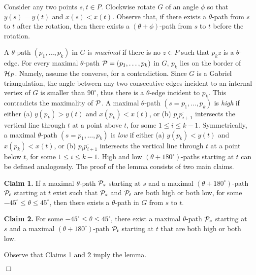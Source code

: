 \documentclass{llncs}
\renewenvironment{proof}
{{\bf Proof:}}{\hspace*{\fill}$\Box$\par\vspace{2mm}}
\begin{document}
\begin{proof}
Consider any two points $s,t\in P$. Clockwise rotate $G$ of an angle $\phi$ so that $y(s)=y(t)$ and $x(s)<x(t)$. Observe that, if there exists a $\theta$-path from $s$ to $t$ after the rotation, then there exists a $(\theta+\phi)$-path from $s$ to $t$ before the rotation.

A $\theta$-path $(p_1,\dots,p_k)$ in $G$ is {\em maximal} if there is no $z\in P$ such that $\overline{p_kz}$ is a $\theta$-edge. For every maximal $\theta$-path ${\cal P}=(p_1, \ldots , p_k)$ in $G$, $p_k$ lies on the border of ${\cal H}_P$. Namely, assume the converse, for a contradiction. Since $G$ is a Gabriel triangulation, the angle between any two consecutive edges incident to an internal vertex of $G$ is smaller than $90^\circ$, thus there is a $\theta$-edge incident to $p_k$.  This contradicts the maximality of $\cal P$.  A maximal $\theta$-path $(s=p_1, \ldots , p_k)$ is {\em high} if either (a) $y(p_k)>y(t)$ and $x(p_k)<x(t)$, or (b) $\overline{p_i p_{i+1}}$ intersects the vertical line through $t$ at a point above $t$, for some $1\leq i\leq k-1$. Symmetrically, a maximal $\theta$-path $(s=p_1, \ldots , p_k)$ is {\em low} if either (a) $y(p_k)<y(t)$ and $x(p_k)<x(t)$, or (b) $\overline{p_i p_{i+1}}$ intersects the vertical line through $t$ at a point below $t$, for some $1\leq i\leq k-1$. High and low $(\theta+180^\circ)$-paths starting at $t$ can be defined analogously. The proof of the lemma consists of two main claims.

{\bf Claim 1.} If a maximal $\theta$-path ${\cal P}_s$ starting at $s$ and a maximal $(\theta+180^\circ)$-path ${\cal P}_t$ starting at $t$ exist such that ${\cal P}_s$ and ${\cal P}_t$ are both high or both low, for some $-45^\circ\leq \theta \leq 45^{\circ}$, then there exists a $\theta$-path in $G$ from $s$ to $t$.

{\bf Claim 2.} For some $-45^\circ\leq \theta \leq 45^{\circ}$, there exist a maximal $\theta$-path ${\cal P}_s$ starting at $s$ and a maximal $(\theta+180^\circ)$-path ${\cal P}_t$ starting at $t$ that are both high or both low.

Observe that Claims 1 and 2 imply the lemma.


\end{proof}
\end{document}
